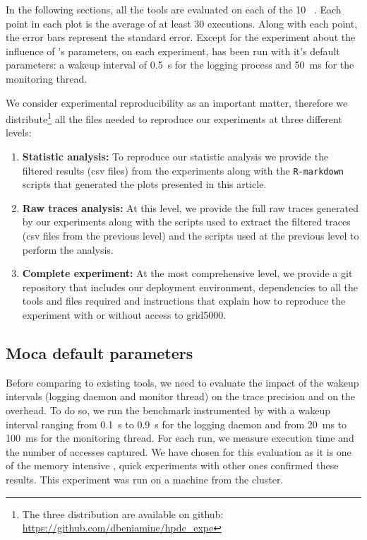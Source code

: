 In the following sections, all the tools are
evaluated on each of the 10 \NPB~\cite{Jin1999}.
Each point in each plot is the average of at least $30$ executions. Along with each point,
the error bars represent the standard error.
Except for the experiment about the influence of \Moca's parameters, on each
experiment, \Moca has been run with it's default parameters: a wakeup interval of
\SI{0.5}{s} for the logging process and \SI{50}{ms} for the monitoring thread.


We consider experimental reproducibility as an important matter, therefore we
distribute\footnote{The three distribution are available on github:\\
    \url{https://github.com/dbeniamine/hpdc_expe}}
all the files needed to reproduce our experiments at three different levels:

\begin{enumerate}
    \item \textbf{Statistic analysis:} To reproduce our statistic analysis we provide
        the filtered results (csv files) from the experiments along with the
        \texttt{R-markdown} scripts that generated the plots presented in this
        article.
    \item \textbf{Raw traces analysis:} At this level, we provide the full raw traces
        generated by our experiments along with the scripts used to extract the
        filtered traces (csv files from the previous level) and the scripts used
	at the previous level to perform the analysis.
    \item \textbf{Complete experiment:} At the most comprehensive level, we provide a git
        repository that includes our deployment environment, dependencies to all the
        tools and files required and instructions that explain how
        to reproduce the experiment with or without access to grid5000.
\end{enumerate}


\subsection{Moca default parameters}
\label{sec:expe-param}

Before comparing \Moca to existing tools, we need to evaluate the impact of
the wakeup intervals (logging daemon and monitor thread) on the trace
precision and on the overhead. To do so, we run the \IS benchmark instrumented by \Moca with
a wakeup interval ranging from \SI{0.1}{s} to  \SI{0.9}{s} for the logging daemon and from \SI{20}{ms} to
\SI{100}{ms} for the monitoring thread. For each run, we measure \IS execution time and the number of
accesses captured. We have chosen \IS for this evaluation as it is one of the memory intensive \NPB,
quick experiments with other ones confirmed these results. This experiment was
run on a machine from the \Edel cluster.

